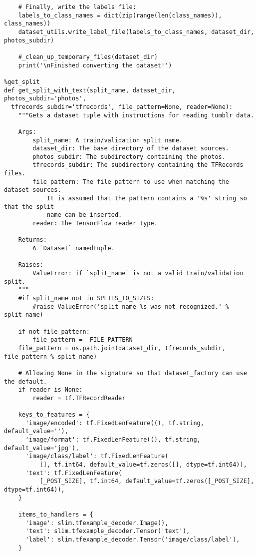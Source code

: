 \begin{lstlisting}
    # Finally, write the labels file:
    labels_to_class_names = dict(zip(range(len(class_names)), class_names))
    dataset_utils.write_label_file(labels_to_class_names, dataset_dir, photos_subdir)

    #_clean_up_temporary_files(dataset_dir)
    print('\nFinished converting the dataset!')
    
%get_split
def get_split_with_text(split_name, dataset_dir, photos_subdir='photos', 
  tfrecords_subdir='tfrecords', file_pattern=None, reader=None):
    """Gets a dataset tuple with instructions for reading tumblr data.

    Args:
        split_name: A train/validation split name.
        dataset_dir: The base directory of the dataset sources.
        photos_subdir: The subdirectory containing the photos.
        tfrecords_subdir: The subdirectory containing the TFRecords files.
        file_pattern: The file pattern to use when matching the dataset sources.
            It is assumed that the pattern contains a '%s' string so that the split
            name can be inserted.
        reader: The TensorFlow reader type.

    Returns:
        A `Dataset` namedtuple.

    Raises:
        ValueError: if `split_name` is not a valid train/validation split.
    """
    #if split_name not in SPLITS_TO_SIZES:
        #raise ValueError('split name %s was not recognized.' % split_name)

    if not file_pattern:
        file_pattern = _FILE_PATTERN
    file_pattern = os.path.join(dataset_dir, tfrecords_subdir, file_pattern % split_name)

    # Allowing None in the signature so that dataset_factory can use the default.
    if reader is None:
        reader = tf.TFRecordReader

    keys_to_features = {
      'image/encoded': tf.FixedLenFeature((), tf.string, default_value=''),
      'image/format': tf.FixedLenFeature((), tf.string, default_value='jpg'),
      'image/class/label': tf.FixedLenFeature(
          [], tf.int64, default_value=tf.zeros([], dtype=tf.int64)),
      'text': tf.FixedLenFeature(
          [_POST_SIZE], tf.int64, default_value=tf.zeros([_POST_SIZE], dtype=tf.int64)),
    }

    items_to_handlers = {
      'image': slim.tfexample_decoder.Image(),
      'text': slim.tfexample_decoder.Tensor('text'),
      'label': slim.tfexample_decoder.Tensor('image/class/label'),
    }


\end{lstlisting}
